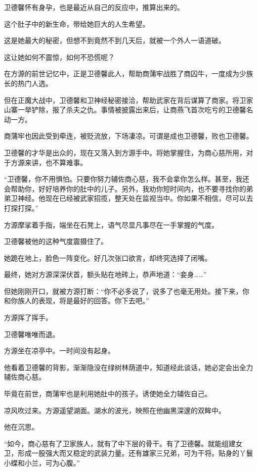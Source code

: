 
\begin{this_body}

卫德馨怀有身孕，也是最近从自己的反应中，推算出来的。

这个肚子中的新生命，带给她巨大的人生希望。

这是她最大的秘密，但想不到竟然不到几天后，就被一个外人一语道破。

这让她如何不震惊，如何不恐慌呢？

在方源的前世记忆中，正是卫德馨此人，帮助商蒲牢战胜了商囚牛，一度成为少族长的热门人选。

但在正魔大战中，卫德馨和卫神经秘密接洽，帮助武家在背后谋算了商家。将卫家山寨一举铲除，报了杀夫之仇。事情被披露出来后，让商燕飞首次吃亏的卫德馨名动一方。

商蒲牢也因此受到牵连，被贬流放，下场凄凉。可谓是成也卫德馨，败也卫德馨。

卫德馨的才华是出众的，现在又落入到方源手中。将她掌握住，为商心慈所用，对于方源来讲，也不算难事。

“卫德馨，你不用惧怕。只要你努力辅佐商心慈，我不会拿你怎么样。甚至，我还会帮助你，好好培养你的肚中的儿子。另外，我劝你短时间内，也不要寻找你的弟弟卫神经。他现在已经被武家招揽，整天处在监视当中。你如果不相信，尽可以去打探打探。”

方源摩挲着手指，端坐在石凳上，语气尽显凡事尽在一手掌握的气度。

卫德馨被他的这种气度震摄住了。

她跪在地上，脸色一阵变化。好几次张口欲言，却终究选择了闭嘴。

最终，她对方源深深伏首，额头贴在地砖上，恭声地道：“妾身……”

但她刚刚开口，就被方源打断：“你不必多说了，说多了也毫无用处。接下来，你和你族人的表现，将是最好的回答。你下去吧。”

方源挥了挥手。

卫德馨唯唯而退。

方源坐在凉亭中。一时间没有起身。

他看着卫德馨的背影，渐渐隐没在绿树林荫道中，知道经此谈话，她必定会出全力辅佐商心慈。

毕竟在前世，商蒲牢也是利用她肚中的孩子。诱使她全力辅佐自己。

凉风吹过来。方源遥望湖面。湖水的波光，映照在他幽黑深邃的双眸中。

他在沉思。

“如今，商心慈有了卫家族人，就有了中下层的骨干。有了卫德馨。就能组建女卫，形成一股强大而又稳定的武装力量。还有雄家三兄弟，可为干将。贴身的丫鬟小蝶和小兰，可为心腹。”


\end{this_body}
